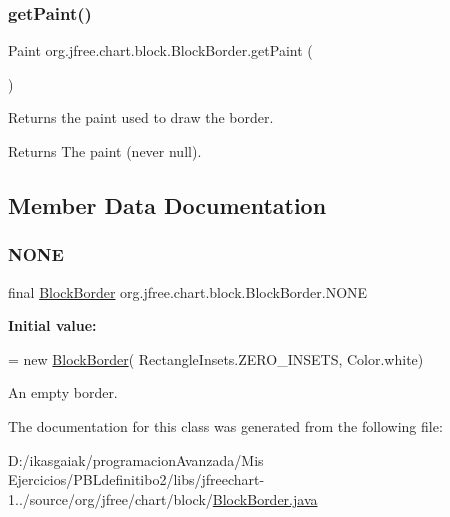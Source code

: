 \subsubsection{\texorpdfstring{get\+Paint()}{getPaint()}}
{\footnotesize\ttfamily Paint org.\+jfree.\+chart.\+block.\+Block\+Border.\+get\+Paint (\begin{DoxyParamCaption}{ }\end{DoxyParamCaption})}

Returns the paint used to draw the border.

\begin{DoxyReturn}{Returns}
The paint (never {\ttfamily null}). 
\end{DoxyReturn}


\subsection{Member Data Documentation}
\mbox{\label{classorg_1_1jfree_1_1chart_1_1block_1_1_block_border_ab51f4a69ef349e2fb741c39d3268b307}} 
\subsubsection{\texorpdfstring{N\+O\+NE}{NONE}}
{\footnotesize\ttfamily final \mbox{\hyperlink{classorg_1_1jfree_1_1chart_1_1block_1_1_block_border}{Block\+Border}} org.\+jfree.\+chart.\+block.\+Block\+Border.\+N\+O\+NE\hspace{0.3cm}{\ttfamily [static]}}

{\bfseries Initial value\+:}
\begin{DoxyCode}
= \textcolor{keyword}{new} \mbox{\hyperlink{classorg_1_1jfree_1_1chart_1_1block_1_1_block_border_a670ab57d4676a42418aad66ede351e48}{BlockBorder}}(
            RectangleInsets.ZERO\_INSETS, Color.white)
\end{DoxyCode}
An empty border. 

The documentation for this class was generated from the following file\+:\begin{DoxyCompactItemize}
\item 
D\+:/ikasgaiak/programacion\+Avanzada/\+Mis Ejercicios/\+P\+B\+Ldefinitibo2/libs/jfreechart-\/1../source/org/jfree/chart/block/\mbox{\hyperlink{_block_border_8java}{Block\+Border.\+java}}\end{DoxyCompactItemize}
